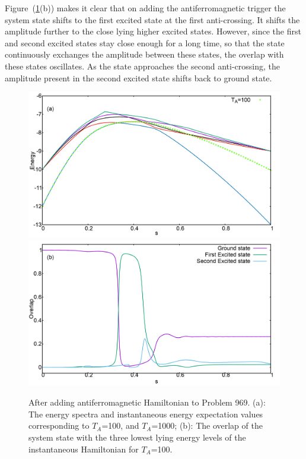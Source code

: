 \documentclass[../main.tex]{subfiles}
\begin{document}
\begin{itemize}
Figure~(\ref{fig:a49}(b)) makes it clear that on adding the antiferromagnetic trigger the system state shifts to the first excited state at the first anti-crossing. It shifts the amplitude further to the close lying higher excited states. However, since the first and second excited states stay close enough for a long time, so that the state continuously exchanges the amplitude between these states, the overlap with these states oscillates. As the state approaches the second anti-crossing, the amplitude present in the second excited state shifts back to ground state.
\begin{figure}
\centering
  \includegraphics[scale=0.24]{969_A_T100_g1.png}
  \includegraphics[scale=0.24]{969_A_g1_Overlap.png}
  \caption{After adding antiferromagnetic Hamiltonian to Problem 969. (a): The energy spectra and instantaneous energy expectation values corresponding to $T_A$=100, and $T_A$=1000; (b): The overlap of the system state with the three lowest lying energy levels of the instantaneous Hamiltonian for $T_A$=100.}
  \label{fig:a49}
 \end{figure}


\end{itemize}
\end{document}
